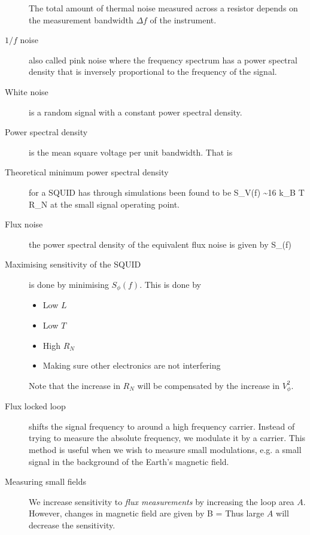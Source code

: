 \begin{description}
The total amount of thermal noise measured across a resistor depends on the measurement bandwidth $\Delta f$ of the instrument. 

\item[$1/f$ noise] also called pink noise where the frequency spectrum has a power spectral density that is inversely proportional to the frequency of the signal. 

\item[White noise] is a random signal with a constant power spectral density. 

\item[Power spectral density] is the mean square voltage per unit bandwidth. That is
\beq
{}
\eeq

\item[Theoretical minimum power spectral density] for a SQUID has through simulations been found to be
\beq
S_V(f) \sim 16 k_B T R_N
\eeq
at the small signal operating point. 

\item[Flux noise] the power spectral density of the equivalent flux noise is given by 
\beq
S_\phi(f)  \simeq {}
\eeq

\item[Maximising sensitivity of the SQUID] is done by minimising $S_\phi(f)$. This is done by 
\begin{itemize}
\item Low $L$
\item Low $T$
\item High $R_N$
\item Making sure other electronics are not interfering
\end{itemize}
Note that the increase in $R_N$ will be compensated by the increase in $V^2_\phi$. 


\item[Flux locked loop] shifts the signal frequency to around a high frequency carrier. Instead of trying to measure the absolute frequency,  we modulate it by a carrier. This method is useful when we wish to measure small modulations, e.g. a small signal in the background of the Earth's magnetic field. 

\item[Measuring small fields] We increase sensitivity to \emph{flux measurements} by increasing the loop area $A$. However, changes in magnetic field are given by 
\beq
\delta B = 
\eeq
Thus large $A$ will decrease the sensitivity. 


\end{description}
